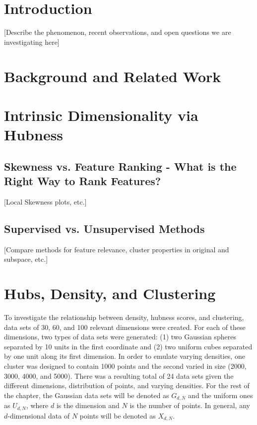 \documentclass[graybox]{svmult}
\begin{document}
\section{Introduction}
\label{sec:1}
[Describe the phenomenon, recent observations, and open questions we are investigating here]



\section{Background and Related Work}
\label{sec:2}



\section{Intrinsic Dimensionality via Hubness}
\label{sec:3}

\subsection{Skewness vs. Feature Ranking - What is the Right Way to Rank Features? }
\label{subsec:3.1}
[Local Skewness plots, etc.]

\subsection{Supervised vs. Unsupervised Methods }
\label{subsec:3.2}
[Compare methods for feature relevance, cluster properties in original and subspace, etc.]


\section{Hubs, Density, and Clustering}
\label{sec:4}

To investigate the relationship between density, hubness scores, and clustering, data sets of 30, 60, and 100 relevant dimensions were created. For each of these dimensions, two types of data sets were generated: (1) two Gaussian spheres separated by 10 units in the first coordinate and (2) two uniform cubes separated by one unit along its first dimension. In order to emulate varying densities, one cluster was designed to contain 1000 points and the second varied in size (2000, 3000, 4000, and 5000). There was a resulting total of 24 data sets given the different dimensions, distribution of points, and varying densities. For the rest of the chapter, the Gaussian data sets will be denoted as $G_{d,N}$ and the uniform ones as $U_{d,N}$, where $d$ is the dimension and $N$ is the number of points. In general, any $d$-dimensional data of $N$ points will be denoted as $X_{d,N}$.
\end{document}
